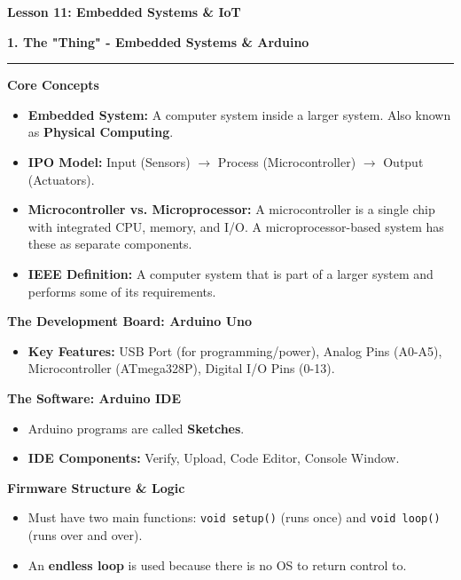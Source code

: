 \documentclass[a4paper, 8pt]{extarticle}
\newcommand{\sectionheading}[1]{\large\textbf{#1}\par\noindent\rule{\linewidth}{0.4pt}}
\newcommand{\subsectionheading}[1]{\normalsize\textbf{#1}}
\begin{document}
\pagestyle{empty} %

\begin{center}
    \fontsize{12pt}{14pt}\selectfont
    \textbf{Lesson 11: Embedded Systems \& IoT}
\end{center}
\vspace{1em}

\begin{multicols}{2}


\sectionheading{1. The "Thing" - Embedded Systems \& Arduino}
\vspace{0.5em}
\subsectionheading{Core Concepts}
\begin{itemize}
    \item \textbf{Embedded System:} A computer system inside a larger system. Also known as \textbf{Physical Computing}.
    \item \textbf{IPO Model:} Input (Sensors) $\rightarrow$ Process (Microcontroller) $\rightarrow$ Output (Actuators).
    \item \textbf{Microcontroller vs. Microprocessor:} A microcontroller is a single chip with integrated CPU, memory, and I/O. A microprocessor-based system has these as separate components.
    \item \textbf{IEEE Definition:} A computer system that is part of a larger system and performs some of its requirements.
\end{itemize}

\subsectionheading{The Development Board: Arduino Uno}
\begin{itemize}
    \item \textbf{Key Features:} USB Port (for programming/power), Analog Pins (A0-A5), Microcontroller (ATmega328P), Digital I/O Pins (0-13).
\end{itemize}

\subsectionheading{The Software: Arduino IDE}
\begin{itemize}
    \item Arduino programs are called \textbf{Sketches}.
    \item \textbf{IDE Components:} Verify, Upload, Code Editor, Console Window.
\end{itemize}

\subsectionheading{Firmware Structure \& Logic}
\begin{itemize}
    \item Must have two main functions: \texttt{void setup()} (runs once) and \texttt{void loop()} (runs over and over).
    \item An \textbf{endless loop} is used because there is no OS to return control to.
\end{itemize}


\end{multicols}
\end{document}
